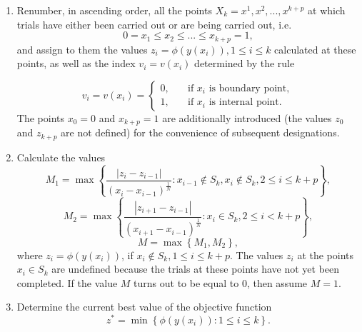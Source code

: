 \documentclass[runningheads]{llncs}
\begin{document}
\begin{enumerate}
\item Renumber, in ascending order, all the points $X_k={x^1,x^2,...,x^{k+p} }$ at which trials have either been carried out or are being carried out, i.e.
\[
0 = x_1 \leq x_2 \leq ... \leq x_{k+p} = 1,
\]
and assign to them the values $z_i = \phi(y(x_i)), 1 \leq i \leq k$ calculated at these points, as well as the index $v_i = v(x_i)$ determined by the rule

\begin{equation}\label{rule_points_index} 
v_i=v(x_i)=
\begin{cases}
    0,     & \quad \text{if } x_i \text{ is boundary point},\\
    1,     & \quad \text{if } x_i \text{ is internal point}.
\end{cases}
\end{equation}
The points $x_0=0$ and $x_{k+p}=1$ are additionally introduced (the values $z_0$ and $z_{k+p}$ are not defined) for the convenience of subsequent designations.

\item Calculate the values
\[
M_1= \max \left\{ \frac{|z_i - z_{i - 1}|}{(x_i - x_{i - 1})^\frac{1}{N}}: x_{i-1} \notin S_k, x_i \notin S_k, 2 \leq i \leq k+p \right\},
\]
\[
M_2= \max \left\{ \frac{|z_{i+1} - z_{i - 1}|}{(x_{i+1} - x_{i - 1})^\frac{1}{N}}: x_{i} \in S_k, 2 \leq i < k+p \right\},
\]
\[
M= \max \left\{ M_1, M_2 \right\},
\]
where $z_i=\phi(y(x_i))$, if $x_i \notin S_k, 1 \leq i \leq k+p$. The values $z_i$ at the points $x_i \in S_k$ are undefined because the trials at these points have not yet been completed. If the value $M$ turns out to be equal to $0$, then assume $M=1$.

\item Determine the current best value of the objective function
\begin{equation}\label{cur_best_val} 
z^* = \min \left\{ \phi(y(x_i)): 1 \leq i \leq k \right\}.
\end{equation}


\end{enumerate}
\end{document}

